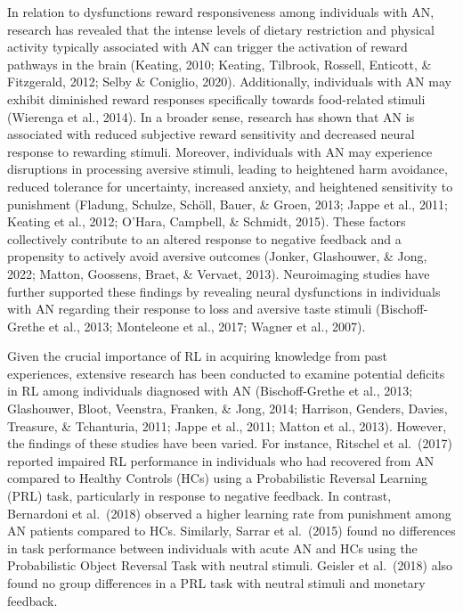 \documentclass[
  man,floatsintext]{apa6}
\begin{document}
In relation to dysfunctions reward responsiveness among individuals with AN, research has revealed that the intense levels of dietary restriction and physical activity typically associated with AN can trigger the activation of reward pathways in the brain (Keating, 2010; Keating, Tilbrook, Rossell, Enticott, \& Fitzgerald, 2012; Selby \& Coniglio, 2020). Additionally, individuals with AN may exhibit diminished reward responses specifically towards food-related stimuli (Wierenga et al., 2014). In a broader sense, research has shown that AN is associated with reduced subjective reward sensitivity and decreased neural response to rewarding stimuli. Moreover, individuals with AN may experience disruptions in processing aversive stimuli, leading to heightened harm avoidance, reduced tolerance for uncertainty, increased anxiety, and heightened sensitivity to punishment (Fladung, Schulze, Schöll, Bauer, \& Groen, 2013; Jappe et al., 2011; Keating et al., 2012; O'Hara, Campbell, \& Schmidt, 2015). These factors collectively contribute to an altered response to negative feedback and a propensity to actively avoid aversive outcomes (Jonker, Glashouwer, \& Jong, 2022; Matton, Goossens, Braet, \& Vervaet, 2013). Neuroimaging studies have further supported these findings by revealing neural dysfunctions in individuals with AN regarding their response to loss and aversive taste stimuli (Bischoff-Grethe et al., 2013; Monteleone et al., 2017; Wagner et al., 2007).

Given the crucial importance of RL in acquiring knowledge from past experiences, extensive research has been conducted to examine potential deficits in RL among individuals diagnosed with AN (Bischoff-Grethe et al., 2013; Glashouwer, Bloot, Veenstra, Franken, \& Jong, 2014; Harrison, Genders, Davies, Treasure, \& Tchanturia, 2011; Jappe et al., 2011; Matton et al., 2013). However, the findings of these studies have been varied. For instance, Ritschel et al.~(2017) reported impaired RL performance in individuals who had recovered from AN compared to Healthy Controls (HCs) using a Probabilistic Reversal Learning (PRL) task, particularly in response to negative feedback. In contrast, Bernardoni et al.~(2018) observed a higher learning rate from punishment among AN patients compared to HCs. Similarly, Sarrar et al.~(2015) found no differences in task performance between individuals with acute AN and HCs using the Probabilistic Object Reversal Task with neutral stimuli. Geisler et al.~(2018) also found no group differences in a PRL task with neutral stimuli and monetary feedback.
\end{document}
